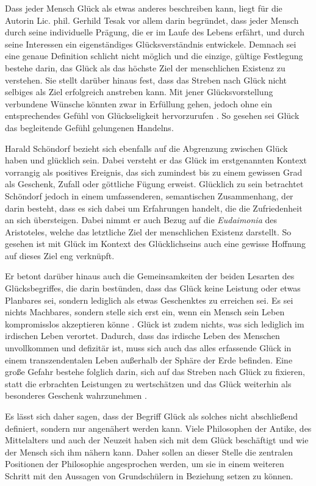 Dass jeder Mensch Glück als etwas anderes beschreiben kann, liegt für die Autorin Lic. phil. Gerhild Tesak vor allem  darin begründet, dass jeder Mensch durch seine individuelle Prägung, die er im Laufe des Lebens erfährt, und durch seine Interessen ein eigenständiges Glücksverständnis entwickele.
Demnach sei eine genaue Definition schlicht nicht möglich und die einzige, gültige Festlegung bestehe darin, das Glück als das höchste Ziel der menschlichen Existenz zu verstehen. 
 Sie stellt darüber hinaus fest, dass das Streben nach Glück nicht selbiges als Ziel erfolgreich anstreben kann. 
 Mit jener Glücksvorstellung verbundene Wünsche könnten zwar in Erfüllung gehen, jedoch ohne ein entsprechendes Gefühl von Glückseligkeit hervorzurufen \cite{GT16}.
 So gesehen sei Glück \glqq das begleitende Gefühl gelungenen Handelns\grqq.
 
Harald Schöndorf bezieht sich ebenfalls auf die Abgrenzung zwischen \glqq Glück haben\grqq{} und \glqq glücklich sein\grqq{}. 
Dabei versteht er das Glück im erstgenannten Kontext vorrangig als positives Ereignis, das sich \glqq zumindest bis zu einem gewissen Grad als Geschenk, Zufall oder göttliche Fügung erweist.\grqq{} 
Glücklich zu sein betrachtet Schöndorf jedoch in einem umfassenderen, semantischen Zusammenhang, der darin besteht, dass es sich dabei um Erfahrungen handelt, die die Zufriedenheit an sich übersteigen. 
Dabei nimmt er auch Bezug auf die \textit{Eudaimonia} des Aristoteles, welche das letztliche Ziel der menschlichen Existenz darstellt. 
So gesehen ist mit Glück im Kontext des \glqq Glücklichseins\grqq{} auch eine gewisse Hoffnung auf dieses Ziel eng verknüpft.

Er betont darüber hinaus auch die Gemeinsamkeiten der beiden Lesarten des Glücksbegriffes, die darin bestünden, dass das Glück keine Leistung oder etwas Planbares sei, sondern lediglich als etwas Geschenktes zu erreichen sei. 
Es sei nichts Machbares, sondern stelle sich erst ein, wenn ein Mensch sein Leben kompromisslos akzeptieren könne \cite[S.\,175]{WB13}.
Glück ist zudem nichts, was sich lediglich im irdischen Leben verortet. 
Dadurch, dass das irdische Leben des Menschen unvollkommen und defizitär ist, muss sich auch das alles erfassende Glück in einem transzendentalen Leben außerhalb der Sphäre der Erde befinden. 
Eine große Gefahr bestehe folglich darin, sich auf das Streben nach Glück zu fixieren, statt die erbrachten Leistungen zu wertschätzen und das Glück weiterhin als besonderes Geschenk wahrzunehmen \cite[S.\,175]{WB13}.

Es lässt sich daher sagen, dass der Begriff \glqq Glück\grqq{} als solches nicht abschließend definiert, sondern nur angenähert werden kann. 
Viele Philosophen der Antike, des Mittelalters und auch der Neuzeit haben sich mit dem Glück beschäftigt und wie der Mensch sich ihm nähern kann. 
Daher sollen an dieser Stelle die zentralen Positionen der Philosophie angesprochen werden, um sie in einem weiteren Schritt mit den Aussagen von Grundschülern in Beziehung setzen zu können.


